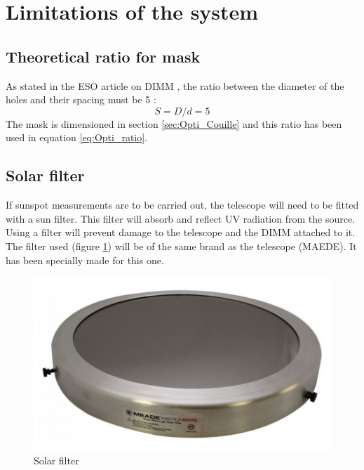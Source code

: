 \section{Limitations of the system}\label{sec:Opti_Limit}
\subsection{Theoretical ratio for mask}
As stated in the ESO article on \Gls{DIMM} \cite{DIMM_ESO}, the ratio between the diameter of the holes and their spacing must be 5 :
\begin{equation}\label{eq:Opti_Ratio}
    S = D/d = 5
\end{equation}
The mask is dimensioned in section \ref{sec:Opti_Couille} and this ratio has been used in equation \ref{eq:Opti_ratio}.
\subsection{Solar filter}
If sunspot measurements are to be carried out, the telescope will need to be fitted with a sun filter. This filter will
absorb and reflect UV radiation from the source. Using a filter will prevent damage to the telescope and the \Gls{DIMM} attached to it.
The filter used (figure \ref{fig:Opti_Filter}) will be of the same brand as the telescope (MAEDE). It has been specially made for this one.
\begin{figure}[H]
    \centering
    \includegraphics[scale=0.6]{assets/figures/Optical Design/Solar_filter.png}
    \caption{Solar filter}
    \label{fig:Opti_Filter}
\end{figure}
